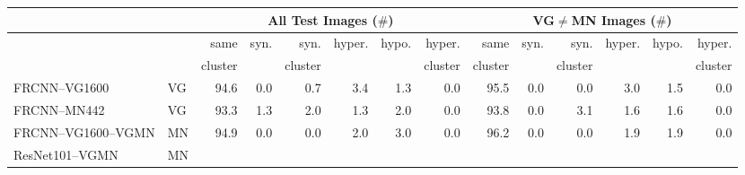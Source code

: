\begin{table}[t]
	\centering
	\small
	\begin{tabular}{llr@{~}|r@{~}r@{~}r@{~}r@{~}r@{~}||r@{~}|r@{~}r@{~}r@{~}r@{~}r@{~}}
		\toprule
		& & \multicolumn{6}{c}{All Test Images ($\#$)} 
		& \multicolumn{6}{c}{VG$\neq$MN Images ($\#$)}\\
		\toprule
		& &  same &  syn. &  syn. &  hyper. &  hypo. &  hyper. &  same &  syn. &  syn. &  hyper. &  hypo. &  hyper. \\
		& 	&  cluster &  & cluster & & & cluster 
			& cluster  &  & cluster & & & cluster \\
		\midrule
		FRCNN--VG1600 & VG     %
		 &                  94.6 &              0.0 &                 0.7 &               3.4 &              1.3 &                  0.0 &                  95.5 &              0.0 &                 0.0 &               3.0 &              1.5 &                  0.0 \\
		FRCNN--MN442 & VG %
		 &                  93.3 &              1.3 &                 2.0 &               1.3 &              2.0 &                  0.0 &                  93.8 &              0.0 &                 3.1 &               1.6 &              1.6 &                  0.0 \\
		\midrule \midrule
		FRCNN--VG1600--VGMN & MN %
		 &                  94.9 &              0.0 &                 0.0 &               2.0 &              3.0 &                  0.0 &                  96.2 &              0.0 &                 0.0 &               1.9 &              1.9 &                  0.0 \\
		\midrule
		ResNet101--VGMN & MN %

\end{tabular}
\end{table}
